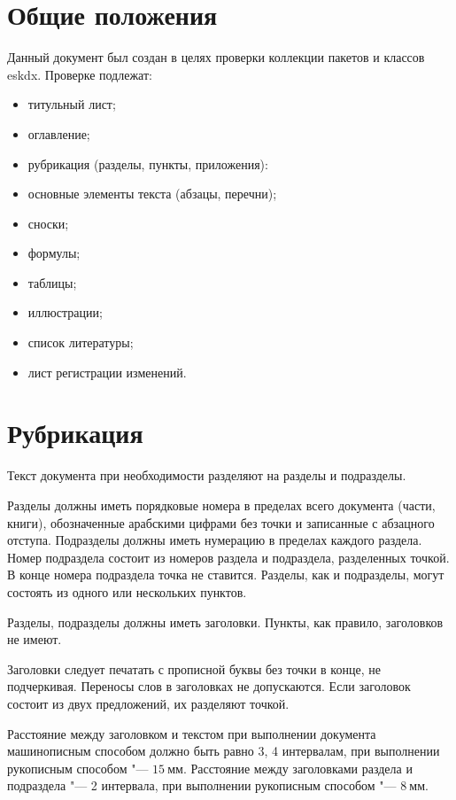 \documentclass[russian,koi8-r,pointsection]{eskdtext}
\begin{document}
\maketitle
\tableofcontents
\newpage
\section{Общие положения}
\point Данный документ был создан в целях проверки коллекции
пакетов и классов eskdx.
\point Проверке подлежат:
\begin{itemize}
\item титульный лист;
\item оглавление;
\item рубрикация (разделы, пункты, приложения):
\item основные элементы текста (абзацы, перечни);
\item сноски;
\item формулы;
\item таблицы;
\item иллюстрации;
\item список литературы;
\item лист регистрации изменений.
\end{itemize}

\section{Рубрикация}
\point Текст документа при необходимости разделяют на разделы и
подразделы.

\point Разделы должны иметь порядковые номера в пределах всего
документа (части, книги), обозначенные арабскими цифрами без точки
и записанные с абзацного отступа. Подразделы должны иметь
нумерацию в пределах каждого раздела. Номер подраздела состоит из
номеров раздела и подраздела, разделенных точкой. В конце номера
подраздела точка не ставится.  Разделы, как и подразделы, могут
состоять из одного или нескольких пунктов.

\point Разделы, подразделы должны иметь заголовки. Пункты, как
правило, заголовков не имеют.

\point Заголовки следует печатать с прописной буквы без точки в
конце, не подчеркивая. Переносы слов в заголовках не допускаются.
Если заголовок состоит из двух предложений, их разделяют точкой.

\point Расстояние между заголовком и текстом при выполнении
документа машинописным способом должно быть равно 3, 4 интервалам,
при выполнении рукописным способом "--- $15~\text{мм}$. Расстояние
между заголовками раздела и подраздела "--- 2 интервала, при
выполнении рукописным способом "--- $8~\text{мм}$.
\end{document}
